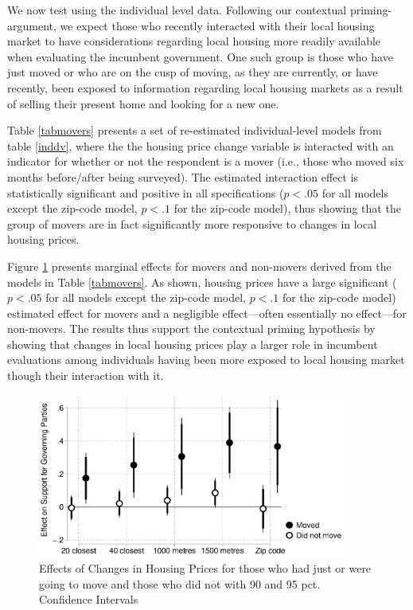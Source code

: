 \documentclass[12pt,a4paper]{article}
\begin{document}
	We now test \htwo using the individual level data. Following our contextual priming-argument, we expect those who recently interacted with their local housing market to have considerations regarding local housing more readily available when evaluating the incumbent government. One such group is those who have just moved or who are on the cusp of moving, as they are currently, or have recently, been exposed to information regarding local housing markets as a result of selling their present home and looking for a new one. 
	
	Table \ref{tabmovers} presents a set of re-estimated individual-level models from table \ref{inddv}, where the the housing price change variable is interacted with an indicator for whether or not the respondent is a mover (i.e., those who moved six months before/after being surveyed). The estimated interaction effect is statistically significant and positive in all specifications ($p<.05$ for all models except the zip-code model, $p<.1$ for the zip-code model), thus  showing that the group of movers are in fact significantly more responsive to changes in local housing prices. 
	
	Figure \ref{move} presents marginal effects for movers and non-movers derived from the models in Table \ref{tabmovers}. As shown, housing prices have a large significant ($p<.05$ for all models except the zip-code model, $p<.1$ for the zip-code model) estimated effect for movers and a negligible effect—often essentially no effect—for non-movers. The results thus support the contextual priming hypothesis by showing that changes in local housing prices play a larger role in incumbent evaluations among individuals having been more exposed to local housing market though their interaction with it.
	
	
	
	\begin{figure}[htbp!]
		\includegraphics[width=0.9\textwidth]{../figures/moving.eps}
		\centering
		\caption{Effects of Changes in Housing Prices for those who had just or were going to move and those who did not with 90 and 95 pct. Confidence Intervals}\label{move}
	\end{figure}
	
\end{document}
